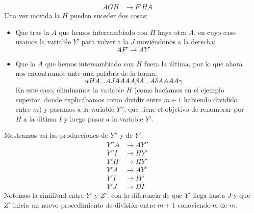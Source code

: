 \begin{ejercicio}
\begin{enumerate}
\begin{align*}
            AGH &\rightarrow F'HA
        \end{align*}
        Una vez movida la $H$ pueden suceder dos cosas:
        \begin{itemize}
            \item Que tras la $A$ que hemos intercambiado con $H$ haya otra $A$, en cuyo caso usamos la variable $Y'$ para volver a la $J$ moviéndonos a la derecha:
                \begin{equation*}
                    AF' \rightarrow AY'
                \end{equation*}
            \item Que la $A$ que hemos intercambiado con $H$ fuera la última, por lo que ahora nos encontramos ante una palabra de la forma:
                \begin{equation*}
                    \alpha H A \ldots A J AAAA \beta A\ldots A \delta AAAA \gamma
                \end{equation*}
                En este caso, eliminamos la variable $H$ (como hacíamos en el ejemplo superior, donde explicábamos como dividir entre $m+1$ habiendo dividido entre $m$) y pasamos a la variable $Y''$, que tiene el objetivo de renombrar por $H$ a la última $I$ y luego pasar a la variable $Y'$.
        \end{itemize}
        Mostramos así las producciones de $Y''$ y de $Y'$:
        \begin{align*}
            Y''A &\rightarrow AY '' \\
            Y''I &\rightarrow HY ' \\
            Y'H &\rightarrow HY' \\
            Y'A &\rightarrow AY' \\
            Y'I &\rightarrow IY' \\
            Y'J &\rightarrow DI
        \end{align*}
        Notemos la similitud entre $Y'$ y $Z'$, con la diferencia de que $Y'$ llega hasta $J$ y que $Z'$ inicia un nuevo procedimiento de división entre $m+1$ conociendo el de $m$.


\end{enumerate}
\end{ejercicio}
